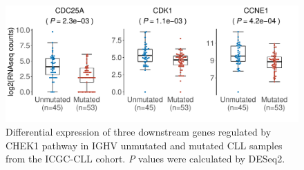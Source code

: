 \documentclass{scrartcl}
\begin{document}
\begin{figure}[h]
    \centering
    \includegraphics[width=15cm]{CHK_expr-1}
    \caption{Differential expression of three downstream genes regulated by CHEK1 pathway in IGHV unmutated and mutated CLL samples from the ICGC-CLL cohort. \textit{P} values  were calculated by DESeq2.}
\end{figure}


\clearpage
\end{document}
